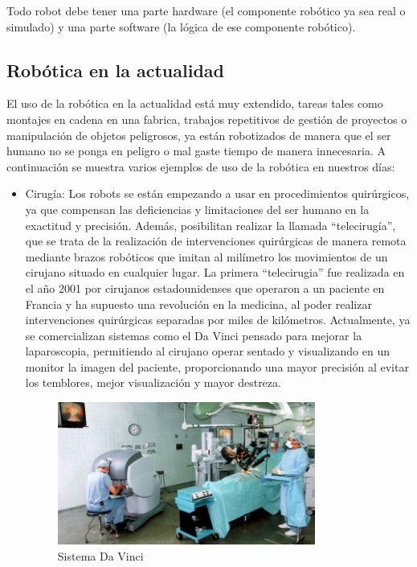 Todo robot debe tener una parte hardware (el componente robótico ya sea real o simulado) y una parte software (la lógica de ese componente robótico).

\subsection{Robótica en la actualidad}
El uso de la robótica en la actualidad está muy extendido, tareas tales como montajes en cadena en una fabrica, trabajos repetitivos de gestión de proyectos o manipulación de objetos peligrosos, ya están robotizados de manera que el ser humano no se ponga en peligro o mal gaste tiempo de manera innecesaria. A continuación se muestra varios ejemplos de uso de la robótica en nuestros días:
\begin{itemize}
\item Cirugía: Los robots se están empezando a usar en procedimientos quirúrgicos, ya que compensan las deficiencias y limitaciones del ser humano en la exactitud y precisión. Además, posibilitan realizar la llamada ``telecirugía'', que se trata de la realización de intervenciones quirúrgicas de manera remota mediante brazos robóticos que imitan al milímetro los movimientos de un cirujano situado en cualquier lugar. La primera ``telecirugia'' fue realizada en el año 2001 por cirujanos estadounidenses que operaron a un paciente en Francia y ha supuesto una revolución en la medicina, al poder realizar intervenciones quirúrgicas separadas por miles de kilómetros. Actualmente, ya se comercializan sistemas como el Da Vinci pensado para mejorar la laparoscopia, permitiendo al cirujano operar sentado y visualizando en un monitor la imagen del paciente, proporcionando una mayor precisión al evitar los temblores, mejor visualización y mayor destreza.
\begin{figure}[H]
  \begin{center}
    \includegraphics[width=0.8\textwidth]{figures/sistemadavinci.jpg}
		\caption{Sistema Da Vinci}

\end{center}
\end{figure}
\end{itemize}
